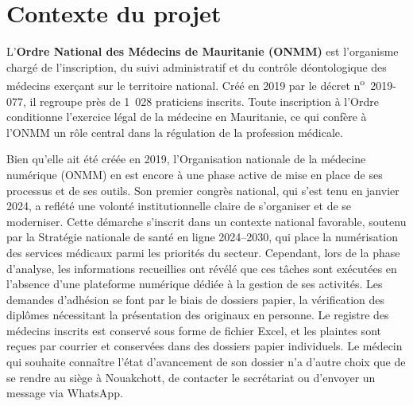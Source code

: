 ﻿\documentclass[12pt,a4paper]{report}
\begin{document}



\section{Contexte du projet}
\label{sec:contexte}

L'\textbf{Ordre National des Médecins de Mauritanie (ONMM)} est l'organisme
chargé de l'inscription, du suivi administratif et du contrôle déontologique
des médecins exerçant sur le territoire national. Créé en 2019 par le décret
n\textsuperscript{o}~2019-077, il regroupe près de 1~028 praticiens inscrits.
Toute inscription à l'Ordre conditionne l'exercice légal de la médecine en
Mauritanie, ce qui confère à l'ONMM un rôle central dans la régulation de
la profession médicale.

Bien qu'elle ait été créée en 2019, l'Organisation nationale de la médecine numérique (ONMM) en est encore à une phase active de mise en place
de ses processus et de ses outils. Son premier congrès national, qui s'est tenu en janvier 2024,
a reflété une volonté institutionnelle claire de s'organiser et de se moderniser. Cette démarche
s'inscrit dans un contexte national favorable, soutenu par la Stratégie nationale de santé en ligne
2024–2030, qui place la numérisation des services médicaux parmi les priorités du secteur.
Cependant, lors de la phase d’analyse, les informations recueillies ont révélé que ces tâches sont exécutées en l’absence d’une plateforme
numérique dédiée à la gestion de ses activités. Les demandes d’adhésion se font par le biais de
dossiers papier, la vérification des diplômes nécessitant la présentation
des originaux en personne. Le registre des médecins inscrits est conservé sous forme de fichier
Excel, et les plaintes sont reçues par courrier et conservées dans des dossiers papier
individuels. Le médecin qui souhaite connaître l’état d’avancement de son dossier n’a d’autre choix que de
se rendre au siège à Nouakchott, de contacter le secrétariat ou d’envoyer un message via
WhatsApp.
\end{document}
